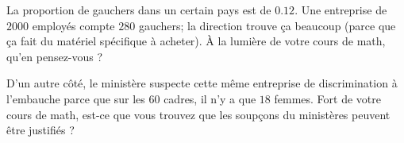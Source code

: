 
\begin{exercice}%
    \label{exosmath-0672}

    La proportion de gauchers dans un certain pays est de \( 0.12\). Une entreprise de \( 2000\) employés compte \( 280\) gauchers; la direction trouve ça beaucoup (parce que ça fait du matériel spécifique à acheter). À la lumière de votre cours de math, qu'en pensez-vous ?

    D'un autre côté, le ministère suspecte cette même entreprise de discrimination à l'embauche parce que sur les \( 60\) cadres, il n'y a que \( 18\) femmes. Fort de votre cours de math, est-ce que vous trouvez que les soupçons du ministères peuvent être justifiés ?

\end{exercice}
